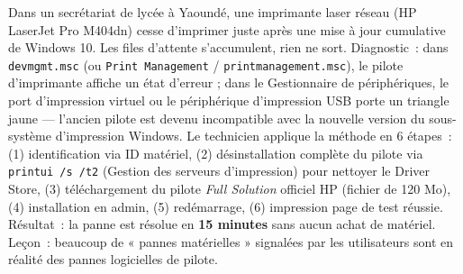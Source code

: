 \documentclass[11pt]{article}
\begin{document}
\begin{exemplebox}
Dans un secrétariat de lycée à Yaoundé, une imprimante laser réseau (HP LaserJet Pro M404dn) cesse d'imprimer juste après une mise à jour cumulative de Windows 10. Les files d'attente s'accumulent, rien ne sort. Diagnostic~: dans \texttt{devmgmt.msc} (ou \texttt{Print Management} / \texttt{printmanagement.msc}), le pilote d'imprimante affiche un état d'erreur ; dans le Gestionnaire de périphériques, le port d'impression virtuel ou le périphérique d'impression USB porte un triangle jaune — l'ancien pilote est devenu incompatible avec la nouvelle version du sous-système d'impression Windows. Le technicien applique la méthode en 6 étapes~: (1) identification via ID matériel, (2) désinstallation complète du pilote via \texttt{printui /s /t2} (Gestion des serveurs d'impression) pour nettoyer le Driver Store, (3) téléchargement du pilote \emph{Full Solution} officiel HP (fichier de \num{120} Mo), (4) installation en admin, (5) redémarrage, (6) impression page de test réussie. Résultat~: la panne est résolue en \textbf{15 minutes} sans aucun achat de matériel. Leçon~: beaucoup de « pannes matérielles » signalées par les utilisateurs sont en réalité des pannes logicielles de pilote.
\end{exemplebox}
\end{document}
